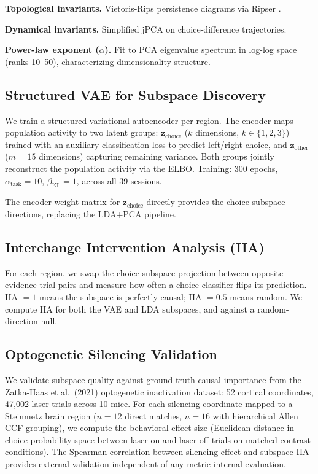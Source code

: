 \documentclass{article}
\begin{document}
\textbf{Topological invariants.} Vietoris-Rips persistence diagrams via Ripser \citep{bauer2021ripser}.

\textbf{Dynamical invariants.} Simplified jPCA on choice-difference trajectories.

\textbf{Power-law exponent ($\alpha$).} Fit to PCA eigenvalue spectrum in log-log space (ranks 10--50), characterizing dimensionality structure.

\subsection{Structured VAE for Subspace Discovery}

We train a structured variational autoencoder \citep{narayanaswamy2017learning} per region. The encoder maps population activity to two latent groups: $\mathbf{z}_{\text{choice}}$ ($k$ dimensions, $k \in \{1,2,3\}$) trained with an auxiliary classification loss to predict left/right choice, and $\mathbf{z}_{\text{other}}$ ($m = 15$ dimensions) capturing remaining variance. Both groups jointly reconstruct the population activity via the ELBO. Training: 300 epochs, $\alpha_{\text{task}} = 10$, $\beta_{\text{KL}} = 1$, across all 39 sessions.

The encoder weight matrix for $\mathbf{z}_{\text{choice}}$ directly provides the choice subspace directions, replacing the LDA+PCA pipeline.

\subsection{Interchange Intervention Analysis (IIA)}

For each region, we swap the choice-subspace projection between opposite-evidence trial pairs and measure how often a choice classifier flips its prediction. IIA $= 1$ means the subspace is perfectly causal; IIA $= 0.5$ means random. We compute IIA for both the VAE and LDA subspaces, and against a random-direction null.

\subsection{Optogenetic Silencing Validation}

We validate subspace quality against ground-truth causal importance from the Zatka-Haas et al.\ (2021) optogenetic inactivation dataset: 52 cortical coordinates, 47,002 laser trials across 10 mice. For each silencing coordinate mapped to a Steinmetz brain region ($n = 12$ direct matches, $n = 16$ with hierarchical Allen CCF grouping), we compute the behavioral effect size (Euclidean distance in choice-probability space between laser-on and laser-off trials on matched-contrast conditions). The Spearman correlation between silencing effect and subspace IIA provides external validation independent of any metric-internal evaluation.
\end{document}
